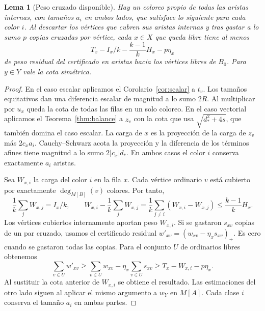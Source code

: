 \documentclass[11pt]{article}
\newtheorem{lemma}[theorem]{Lema}
\begin{document}
\begin{lemma}[Peso cruzado disponible]\label{lem:available}
Hay un coloreo propio de todas las aristas internas, con tamaños \(a_i\) en ambos lados, que satisface lo siguiente para cada color \(i\). Al descartar los vértices que cubren sus aristas internas y tras gastar a lo sumo \(p\) copias cruzadas por vértice, cada \(x\in X\) que queda libre tiene al menos
\[
 T_x-I_x/k-\frac{k-1}{k}H_x-p\eta_x
\]
de peso residual del certificado en aristas hacia los vértices libres de \(B_0\). Para \(y\in Y\) vale la cota simétrica.
\end{lemma}

\begin{proof}
En el caso escalar aplicamos el Corolario~\ref{cor:scalar} a \(t_v\). Los tamaños equitativos dan una diferencia escalar de magnitud a lo sumo \(2R\). Al multiplicar por \(u_x\) queda la cota de todas las filas en un solo coloreo. En el caso vectorial aplicamos el Teorema~\ref{thm:balance} a \(z_v\) con la cota que usa \(\sqrt{d_*^2+4s}\), que también domina el caso escalar. La carga de \(x\) es la proyección de la carga de \(z_v\) más \(2c_x a_i\). Cauchy--Schwarz acota la proyección y la diferencia de los términos afines tiene magnitud a lo sumo \(2|c_x|d_*\). En ambos casos el color \(i\) conserva exactamente \(a_i\) aristas.

Sea \(W_{x,i}\) la carga del color \(i\) en la fila \(x\). Cada vértice ordinario \(v\) está cubierto por exactamente \(\deg_{M[B]}(v)\) colores. Por tanto,
\[
 \frac1k\sum_j W_{x,j}=I_x/k,\qquad
 W_{x,i}-\frac1k\sum_jW_{x,j}
       =\frac1k\sum_{j\ne i}(W_{x,i}-W_{x,j})
       \le\frac{k-1}{k}H_x.
\]
Los vértices cubiertos internamente aportan peso \(W_{x,i}\). Si se gastaron \(s_{xv}\) copias de un par cruzado, usamos el certificado residual \(w'_{xv}=(w_{xv}-\eta_x s_{xv})_+\). Es cero cuando se gastaron todas las copias. Para el conjunto \(U\) de ordinarios libres obtenemos
\[
 \sum_{v\in U} w'_{xv}
 \ge \sum_{v\in U} w_{xv}-\eta_x\sum_{v\in U}s_{xv}
 \ge T_x-W_{x,i}-p\eta_x.
\]
Al sustituir la cota anterior de \(W_{x,i}\) se obtiene el resultado. Las estimaciones del otro lado siguen al aplicar el mismo argumento a \(w_Y\) en \(M[A]\). Cada clase \(i\) conserva el tamaño \(a_i\) en ambas partes.
\end{proof}
\end{document}
